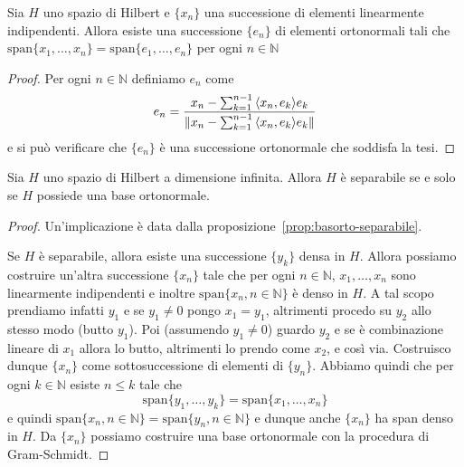 \begin{lemma}
    Sia \(H\) uno spazio di Hilbert e \(\{x_{n}\} \) una successione di elementi
    linearmente indipendenti. Allora esiste una successione \(\{e_{n}\} \) di
    elementi ortonormali tali che \(\mathrm{span}\{x_{1}, \dots, x_{n}\} =
    \mathrm{span}\{e_{1}, \dots, e_{n}\} \) per ogni \(n \in \mathbb{N}\)
\end{lemma}
\begin{proof}
    Per ogni \(n \in \mathbb{N}\) definiamo \(e_{n}\) come
    \[
      e_{n} = \frac{x_{n} - \sum_{k=1}^{n-1} {\left\langle x_{n}, e_{k}\right\rangle} e_{k}}{\|x_{n} -
      \sum_{k=1}^{n-1} {\left\langle x_{n}, e_{k}\right\rangle} e_{k}\|}
    \]
    e si può verificare che \(\{e_{n}\} \) è una successione ortonormale che
    soddisfa la tesi.
\end{proof}

\begin{theorem}\label{thm:basorto-separabile}
    Sia \(H\) uno spazio di Hilbert a dimensione infinita. Allora \(H\) è
    separabile se e solo se \(H\) possiede una base ortonormale.
\end{theorem}
\begin{proof}
    Un'implicazione è data dalla proposizione~\ref{prop:basorto-separabile}.

    Se \(H\) è separabile, allora esiste una successione \(\{y_{k}\} \) densa in
    \(H\). Allora possiamo costruire un'altra successione \(\{x_{n}\}\) tale che
    per ogni \(n \in \mathbb{N}\), \(x_{1}, \dots, x_{n}\) sono linearmente
    indipendenti e inoltre \(\mathrm{span}\{x_{n}, n \in \mathbb{N}\} \) è denso
    in \(H\). A tal scopo prendiamo infatti \(y_{1}\) e se \(y_{1} \neq 0\)
    pongo \(x_{1} = y_{1}\), altrimenti procedo su \(y_{2}\) allo stesso modo
    (butto \(y_{1}\)). Poi (assumendo \(y_{1} \neq 0\)) guardo \(y_{2}\) e se è
    combinazione lineare di \(x_{1}\) allora lo butto, altrimenti lo prendo come
    \(x_{2}\), e così via. Costruisco dunque \(\{x_{n}\}\) come sottosuccessione
    di elementi di \(\{y_{n}\} \). Abbiamo quindi che per ogni \(k \in
    \mathbb{N}\) esiste \(n \le k\) tale che 
    \[
        \mathrm{span}\{y_{1}, \dots, y_{k}\} = \mathrm{span}\{x_{1}, \dots,
        x_{n}\}
    \]
    e quindi \(\mathrm{span}\{x_{n}, n \in \mathbb{N}\} = \mathrm{span}\{y_{n},
    n \in \mathbb{N}\} \) e dunque anche \(\{x_{n}\} \) ha span denso in \(H\).
    Da \(\{x_{n}\} \) possiamo costruire una base ortonormale con la procedura
    di Gram-Schmidt.
\end{proof}

